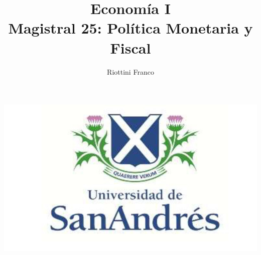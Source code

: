 \documentclass{beamer}
\title[Economía I]{Economía I \vspace{4mm}
\\ Magistral 25: Política Monetaria y Fiscal}
\date{}
\author[Franco Riottini]{Riottini Franco}
\institute[]{Universidad de San Andrés}
\begin{document}
\begin{frame}
\titlepage
\centering

\includegraphics[scale=0.2]{../Figures/logoUDESA.jpg} 
\end{frame}
\end{document}
